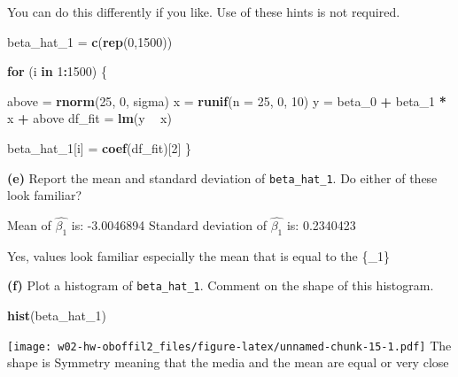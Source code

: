 \documentclass[]{article}
\newenvironment{Shaded}{\begin{snugshade}}{\end{snugshade}}
\newcommand{\ControlFlowTok}[1]{\textcolor[rgb]{0.13,0.29,0.53}{\textbf{#1}}}
\newcommand{\DataTypeTok}[1]{\textcolor[rgb]{0.13,0.29,0.53}{#1}}
\newcommand{\DecValTok}[1]{\textcolor[rgb]{0.00,0.00,0.81}{#1}}
\newcommand{\KeywordTok}[1]{\textcolor[rgb]{0.13,0.29,0.53}{\textbf{#1}}}
\newcommand{\NormalTok}[1]{#1}
\newcommand{\OperatorTok}[1]{\textcolor[rgb]{0.81,0.36,0.00}{\textbf{#1}}}
\newcommand{\StringTok}[1]{\textcolor[rgb]{0.31,0.60,0.02}{#1}}
\begin{document}
You can do this differently if you like. Use of these hints is not
required.

\begin{Shaded}
\begin{Highlighting}[]
\NormalTok{beta_hat_}\DecValTok{1}\NormalTok{ =}\StringTok{ }\KeywordTok{c}\NormalTok{(}\KeywordTok{rep}\NormalTok{(}\DecValTok{0}\NormalTok{,}\DecValTok{1500}\NormalTok{))}

\ControlFlowTok{for}\NormalTok{ (i }\ControlFlowTok{in} \DecValTok{1}\OperatorTok{:}\DecValTok{1500}\NormalTok{) \{}
  
\NormalTok{  above =}\StringTok{ }\KeywordTok{rnorm}\NormalTok{(}\DecValTok{25}\NormalTok{, }\DecValTok{0}\NormalTok{, sigma)}
\NormalTok{  x =}\StringTok{ }\KeywordTok{runif}\NormalTok{(}\DataTypeTok{n =} \DecValTok{25}\NormalTok{, }\DecValTok{0}\NormalTok{, }\DecValTok{10}\NormalTok{)}
\NormalTok{  y =}\StringTok{ }\NormalTok{beta_}\DecValTok{0} \OperatorTok{+}\StringTok{ }\NormalTok{beta_}\DecValTok{1} \OperatorTok{*}\StringTok{ }\NormalTok{x }\OperatorTok{+}\StringTok{ }\NormalTok{above}
\NormalTok{  df_fit =}\StringTok{ }\KeywordTok{lm}\NormalTok{(y }\OperatorTok{~}\StringTok{ }\NormalTok{x)}
  
\NormalTok{  beta_hat_}\DecValTok{1}\NormalTok{[i] =}\StringTok{ }\KeywordTok{coef}\NormalTok{(df_fit)[}\DecValTok{2}\NormalTok{]}
\NormalTok{\}}
\end{Highlighting}
\end{Shaded}

\textbf{(e)} Report the mean and standard deviation of
\texttt{beta\_hat\_1}. Do either of these look familiar?

Mean of \(\hat{\beta_1}\) is: -3.0046894 Standard deviation of
\(\hat{\beta_1}\) is: 0.2340423

Yes, values look familiar especially the mean that is equal to the
\{\beta\_1\}

\textbf{(f)} Plot a histogram of \texttt{beta\_hat\_1}. Comment on the
shape of this histogram.

\begin{Shaded}
\begin{Highlighting}[]
\KeywordTok{hist}\NormalTok{(beta_hat_}\DecValTok{1}\NormalTok{)}
\end{Highlighting}
\end{Shaded}

\texttt{[image: w02-hw-oboffil2\_files/figure-latex/unnamed-chunk-15-1.pdf]}
The shape is Symmetry meaning that the media and the mean are equal or
very close
\end{document}
